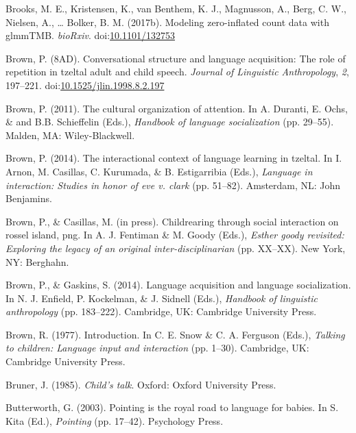 \documentclass[floatsintext,man]{apa6}
\theoremstyle{definition}
\theoremstyle{definition}
\theoremstyle{definition}
\theoremstyle{remark}
\begin{document}
\hypertarget{ref-brooks2017modeling}{}
Brooks, M. E., Kristensen, K., van Benthem, K. J., Magnusson, A., Berg,
C. W., Nielsen, A., \ldots{} Bolker, B. M. (2017b). Modeling
zero-inflated count data with glmmTMB. \emph{bioRxiv}.
doi:\href{https://doi.org/10.1101/132753}{10.1101/132753}

\hypertarget{ref-brown1998conversational}{}
Brown, P. (8AD). Conversational structure and language acquisition: The
role of repetition in tzeltal adult and child speech. \emph{Journal of
Linguistic Anthropology}, \emph{2}, 197--221.
doi:\href{https://doi.org/10.1525/jlin.1998.8.2.197}{10.1525/jlin.1998.8.2.197}

\hypertarget{ref-brown2011cultural}{}
Brown, P. (2011). The cultural organization of attention. In A. Duranti,
E. Ochs, \& and B.B. Schieffelin (Eds.), \emph{Handbook of language
socialization} (pp. 29--55). Malden, MA: Wiley-Blackwell.

\hypertarget{ref-brown2014interactional}{}
Brown, P. (2014). The interactional context of language learning in
tzeltal. In I. Arnon, M. Casillas, C. Kurumada, \& B. Estigarribia
(Eds.), \emph{Language in interaction: Studies in honor of eve v. clark}
(pp. 51--82). Amsterdam, NL: John Benjamins.

\hypertarget{ref-brownIPchildrearing}{}
Brown, P., \& Casillas, M. (in press). Childrearing through social
interaction on rossel island, png. In A. J. Fentiman \& M. Goody (Eds.),
\emph{Esther goody revisited: Exploring the legacy of an original
inter-disciplinarian} (pp. XX--XX). New York, NY: Berghahn.

\hypertarget{ref-brown2014language}{}
Brown, P., \& Gaskins, S. (2014). Language acquisition and language
socialization. In N. J. Enfield, P. Kockelman, \& J. Sidnell (Eds.),
\emph{Handbook of linguistic anthropology} (pp. 183--222). Cambridge,
UK: Cambridge University Press.

\hypertarget{ref-brown1997introduction}{}
Brown, R. (1977). Introduction. In C. E. Snow \& C. A. Ferguson (Eds.),
\emph{Talking to children: Language input and interaction} (pp. 1--30).
Cambridge, UK: Cambridge University Press.

\hypertarget{ref-bruner1985childs}{}
Bruner, J. (1985). \emph{Child's talk}. Oxford: Oxford University Press.

\hypertarget{ref-butterworth2003pointing}{}
Butterworth, G. (2003). Pointing is the royal road to language for
babies. In S. Kita (Ed.), \emph{Pointing} (pp. 17--42). Psychology
Press.
\end{document}
